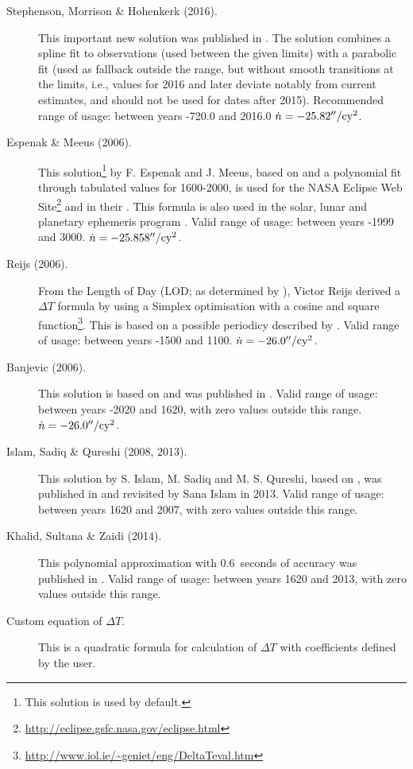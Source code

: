\begin{description}
\item[Stephenson, Morrison \& Hohenkerk (2016).] This important new solution was published 
  in . 
  The solution combines a spline fit to observations (used between the given limits) 
  with a parabolic fit (used as fallback outside the range, but without smooth transitions at the limits, i.e., 
  values for 2016 and later deviate notably from current estimates, and should not be used for dates after 2015).
  Recommended range of usage: between years -720.0 and 2016.0 $\dot{n}=-25.82''/\mathrm{cy}^2$.
  
\item[Espenak \& Meeus (2006).] This solution\footnote{This solution
    is used by default.} by F. Espenak and J. Meeus, based on 
	\citet{2004JHA....35..327M} and a polynomial fit
  through tabulated values for 1600-2000, is used for the NASA Eclipse
  Web Site\footnote{\url{http://eclipse.gsfc.nasa.gov/eclipse.html}}
  and in their . This formula is also used in the
  solar, lunar and planetary ephemeris program . Valid
  range of usage: between years -1999 and
  3000. $\dot{n}=-25.858''/\mathrm{cy}^2$.

\item[Reijs (2006).] From the Length of Day (LOD; as determined by
  \citet{2004JHA....35..327M}), Victor Reijs
  derived a $\Delta T$ formula by using a Simplex optimisation with a
  cosine and square
  function\footnote{\url{http://www.iol.ie/~geniet/eng/DeltaTeval.htm}}. This
  is based on a possible periodicy described by
  \citet{2004JHA....35..327M}. Valid range of usage: between
  years -1500 and 1100. $\dot{n}=-26.0''/\mathrm{cy}^2$.

\item[Banjevic (2006).] This solution is based on
  \citet{1984RSPTA.313...47S} and was
  published in . Valid range of usage: between
  years -2020 and 1620, with zero values outside this range. 
  $\dot{n}=-26.0''/\mathrm{cy}^2$.

\item[Islam, Sadiq \& Qureshi (2008, 2013).] This solution by
  S. Islam, M. Sadiq and M. S. Qureshi, based on \citet{2000JBAA..110..323M}, was published in 
   and revisited by Sana Islam
  in 2013. Valid range of usage: between years 1620 and 2007, with
  zero values outside this range.

\item[Khalid, Sultana \& Zaidi (2014).] This polynomial approximation with 0.6~seconds 
  of accuracy was published in . 
  Valid range of usage: between years 1620 and 2013, with zero values outside this range.

\item[Custom equation of $\Delta T$.] This is a quadratic formula for
  calculation of $\Delta T$ with coefficients defined by the user.
\end{description}


